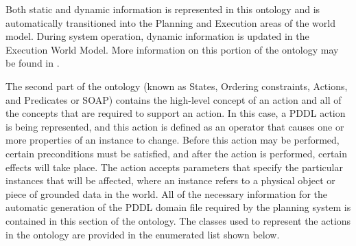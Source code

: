 Both static and dynamic information is represented in this
ontology and is automatically transitioned into the Planning and Execution areas of the world model. During system
operation,  dynamic information is updated in the Execution World Model.
More information on this portion of the ontology may be found in \cite{Balakirsky2012-1}.


The second part of the ontology (known as States, Ordering constraints, Actions, and Predicates or SOAP) contains the high-level concept of an action and all of the concepts 
that are required to support an action. In this case, a PDDL \cite{PDDL} action is being represented, and this action is defined
 as an operator that causes one or more properties of an 
instance to change. Before this action may be
performed, certain preconditions must be satisfied, and after the action is performed, certain effects will take place. The action accepts parameters that specify the particular
instances that will be affected, where an instance refers to a physical object or piece of grounded data in the world. All of the necessary information for the automatic generation of the PDDL domain file required by the planning system is contained in this section of the ontology. The classes used to represent the actions in the ontology are provided in the
enumerated list shown below. 
